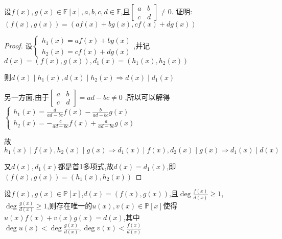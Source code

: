 \begin{example}
    设$f(x),g(x)\in \mathbb{F}[x],a,b,c,d\in \mathbb{F}$,且$\begin{bmatrix}
        a & b \\ c & d
    \end{bmatrix} \ne 0$. 证明:$(f(x),g(x))=(af(x)+bg(x),cf(x)+dg(x))$
\end{example}

\begin{proof}

    设$\begin{cases}
        h_1(x)=af(x)+bg(x) \\ 
        h_2(x)=cf(x)+dg(x)
    \end{cases}$,并记$d(x)=(f(x),g(x)),d_1(x)=(h_1(x),h_2(x))$

    则$d(x)\mid h_1(x),d(x)\mid h_2(x)\Longrightarrow d(x)\mid d_1(x)$

    另一方面,由于$\begin{bmatrix}
        a & b \\ c & d
    \end{bmatrix} =ad-bc \ne 0$
    ,所以可以解得
    $\begin{cases}
        h_1(x)=\frac{d}{ad-bc}f(x)-\frac{b}{ad-bc}g(x) \\ 
        h_2(x)=-\frac{c}{ad-bc}f(x)+\frac{a}{ad-bc}g(x)
    \end{cases}$

    故$h_1(x)\mid f(x),h_2(x)\mid g(x) \Longrightarrow d_1(x)\mid f(x),d_2(x)\mid g(x) \Longrightarrow d_1(x)\mid d(x)$

    又$d(x),d_1(x)$都是首1多项式,故$d(x)=d_1(x)$,即$(f(x),g(x))=(h_1(x),h_2(x))$
\end{proof}

\begin{example}\label{例题1.2.4}
    设$f(x),g(x)\in \mathbb{P}[x]$,$d(x)=(f(x),g(x))$,且$\deg \frac{f(x)}{d(x)}\ge 1$,$\deg \frac{g(x)}{d(x)}\ge 1$,则存在唯一的$u(x),v(x)\in \mathbb{P}[x]$使得$u(x)f(x)+v(x)g(x)=d(x)$,其中$\deg u(x)<\deg \frac{g(x)}{d(x)},\deg v(x)<\frac{f(x)}{d(x)}$
\end{example}

